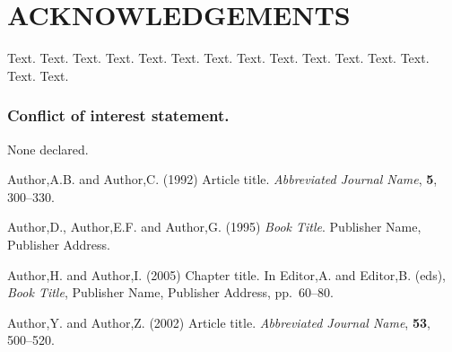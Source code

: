 \documentclass[a4,center,fleqn]{NAR}
\begin{document}
\section{ACKNOWLEDGEMENTS}

Text. Text. Text. Text. Text. Text. Text. Text. Text. Text. Text.
Text. Text. Text. Text.


\subsubsection{Conflict of interest statement.} None declared.
\newpage


\begin{thebibliography}{4}

Author,A.B. and Author,C. (1992)
Article title.
\textit{Abbreviated Journal Name}, \textbf{5}, 300--330.

Author,D., Author,E.F. and Author,G. (1995)
\textit{Book Title}.
Publisher Name, Publisher Address.

Author,H. and Author,I. (2005)
Chapter title.
In
Editor,A. and Editor,B. (eds),
\textit{Book Title},
Publisher Name, Publisher Address,
pp.\ 60--80.

Author,Y. and Author,Z. (2002)
Article title.
\textit{Abbreviated Journal Name}, \textbf{53}, 500--520.

\end{thebibliography}
\end{document}
